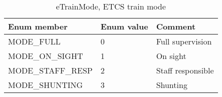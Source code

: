\documentclass{template/openetcs_article}
\begin{document}
\begin{longtable}{|l|l|l|}
	\caption{eTrainMode, ETCS train mode} \\ 
	\hline
		\begin{minipage}[t]{0.45\linewidth} \textbf{Enum member}	\end{minipage}
	&	\begin{minipage}[t]{0.15\linewidth} \textbf{Enum value}	\end{minipage} 
	&	\begin{minipage}[t]{0.45\linewidth} \textbf{Comment} \end{minipage} \\
	\hline
		\begin{minipage}[t]{0.45\linewidth} MODE\_FULL	\end{minipage}
	&	\begin{minipage}[t]{0.15\linewidth} 0	\end{minipage} 
	&	\begin{minipage}[t]{0.45\linewidth} Full supervision \end{minipage} \\
	\hline
		\begin{minipage}[t]{0.45\linewidth} MODE\_ON\_SIGHT \end{minipage}
	&	\begin{minipage}[t]{0.15\linewidth} 1	\end{minipage} 
	&	\begin{minipage}[t]{0.45\linewidth} On sight\end{minipage} \\
	\hline
		\begin{minipage}[t]{0.45\linewidth} MODE\_STAFF\_RESP \end{minipage}
	&	\begin{minipage}[t]{0.15\linewidth} 2	\end{minipage} 
	&	\begin{minipage}[t]{0.45\linewidth} Staff responsible \end{minipage} \\
	\hline
		\begin{minipage}[t]{0.45\linewidth} MODE\_SHUNTING \end{minipage}
	&	\begin{minipage}[t]{0.15\linewidth} 3	\end{minipage} 
	&	\begin{minipage}[t]{0.45\linewidth} Shunting \end{minipage} \\
	\hline

\end{longtable}
\end{document}
